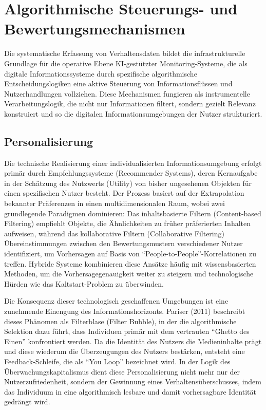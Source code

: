 \section{Algorithmische Steuerungs- und Bewertungsmechanismen}

Die systematische Erfassung von Verhaltensdaten bildet die infrastrukturelle Grundlage für die operative Ebene \ac{KI}-gestützter Monitoring-Systeme, die als digitale Informationssysteme durch spezifische algorithmische Entscheidungslogiken eine aktive Steuerung von Informationsflüssen und Nutzerhandlungen vollziehen. Diese Mechanismen fungieren als instrumentelle Verarbeitungslogik, die nicht nur Informationen filtert, sondern gezielt Relevanz konstruiert und so die digitalen Informationsumgebungen der Nutzer strukturiert.

\subsection{Personalisierung}

Die technische Realisierung einer individualisierten Informationsumgebung erfolgt primär durch Empfehlungssysteme (Recommender Systems), deren Kernaufgabe in der Schätzung des Nutzwerts (Utility) von bisher ungesehenen Objekten für einen spezifischen Nutzer besteht. Der Prozess basiert auf der Extrapolation bekannter Präferenzen in einen multidimensionalen Raum, wobei zwei grundlegende Paradigmen dominieren: Das inhaltsbasierte Filtern (Content-based Filtering) empfiehlt Objekte, die Ähnlichkeiten zu früher präferierten Inhalten aufweisen, während das kollaborative Filtern (Collaborative Filtering) Übereinstimmungen zwischen den Bewertungsmustern verschiedener Nutzer identifiziert, um Vorhersagen auf Basis von \enquote{People-to-People}-Korrelationen zu treffen. Hybride Systeme kombinieren diese Ansätze häufig mit wissensbasierten Methoden, um die Vorhersagegenauigkeit weiter zu steigern und technologische Hürden wie das Kaltstart-Problem zu überwinden.

Die Konsequenz dieser technologisch geschaffenen Umgebungen ist eine zunehmende Einengung des Informationshorizonts. Pariser (2011) beschreibt dieses Phänomen als Filterblase (Filter Bubble), in der die algorithmische Selektion dazu führt, dass Individuen primär mit dem vertrauten \enquote{Ghetto des Einen} konfrontiert werden. Da die Identität des Nutzers die Medieninhalte prägt und diese wiederum die Überzeugungen des Nutzers bestärken, entsteht eine Feedback-Schleife, die als \enquote{You Loop} bezeichnet wird. In der Logik des Überwachungskapitalismus dient diese Personalisierung nicht mehr nur der Nutzerzufriedenheit, sondern der Gewinnung eines Verhaltensüberschusses, indem das Individuum in eine algorithmisch lesbare und damit vorhersagbare Identität gedrängt wird.

